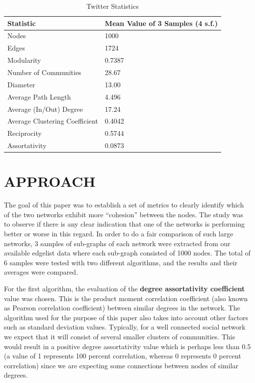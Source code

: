 \documentclass[a4paper, 10pt, conference]{ieeeconf}      %
\begin{document}
\begin{table}[htb]
\caption{Twitter Statistics}
\label{table_twitter}
\begin{center}
\begin{tabular}{ | l | l | } 
\hline
\textbf{Statistic} & \textbf{Mean Value of 3 Samples (4 s.f.)}\\
\hline
Nodes & 1000\\
Edges & 1724\\
Modularity & 0.7387\\
Number of Communities & 28.67\\
Diameter & 13.00\\
Average Path Length & 4.496\\
Average (In/Out) Degree & 17.24\\
Average Clustering Coefficient & 0.4042\\
Reciprocity & 0.5744\\
Assortativity & 0.0873\\
\hline
\end{tabular}
\end{center}
\end{table}

\section{APPROACH}
The goal of this paper was to establish a set of metrics to clearly identify which of the two networks exhibit more “cohesion” between the nodes. The study was to observe if there is any clear indication that one of the networks is performing better or worse in this regard. In order to do a fair comparison of such large networks, 3 samples of sub-graphs of each network were extracted from our available edgelist data where each sub-graph consisted of 1000 nodes. The total of 6 samples were tested with two different algorithms, and the results and their averages were compared.

For the first algorithm, the evaluation of the \textbf{degree assortativity coefficient} value was chosen. This is the product moment correlation coefficient (also known as Pearson correlation coefficient) between similar degrees in the network. The algorithm used for the purpose of this paper also takes into account other factors such as standard deviation values. Typically, for a well connected social network we expect that it will consist of several smaller clusters of communities. This would result in a positive degree assortativity value which is perhaps less than 0.5 (a value of 1 represents 100 percent correlation, whereas 0 represents 0 percent correlation) since we are expecting some connections between nodes of similar degrees. 
\end{document}
